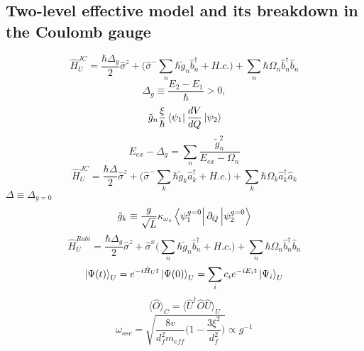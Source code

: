 \documentclass{article}
\begin{document}
\subsection*{Two-level effective model and its breakdown in the Coulomb gauge}
\begin{equation*}
    \hat{H}^{JC}_{U} = \frac{\hbar \Delta_g}{2}\hat{\sigma}^z + \bigg(\hat{\sigma}^- \sum_n \hbar\tilde{g}_n\hat{b}_n^{\dagger} + H.c.\bigg)
    + \sum_n \hbar\Omega_n \hat{b}_n^\dagger \hat{b}_n
\end{equation*}
\begin{equation*}
    \Delta_g \equiv \frac{E_2 - E_1}{\hbar} > 0,
\end{equation*}
\begin{equation*}
    \tilde{g}_n \frac{\xi}{\hbar}\bra{\psi_1}\frac{dV}{dQ}\ket{\psi_2}
\end{equation*}
\begin{equation*}
    E_{ex} - \Delta_g = \sum_n \frac{\tilde{g}^2_n}{E_{ex} - \Omega_n}
\end{equation*}
\begin{equation*}
    \hat{H}^{JC}_{U} = \frac{\hbar \Delta}{2}\hat{\sigma}^z + \bigg(\hat{\sigma}^- \sum_k \hbar\tilde{g}_k\hat{a}_k^{\dagger} + H.c.\bigg)
    + \sum_k \hbar\Omega_k \hat{a}_k^\dagger \hat{a}_k
\end{equation*}
$\Delta \equiv \Delta_{g=0}$
\begin{equation*}
    \tilde{g}_k \equiv \frac{g}{\sqrt{L}} \kappa_{\omega_c}\bra{\psi_1^{g=0}}\partial_Q\ket{\psi_2^{g=0}}
\end{equation*} 
\begin{equation*}
    \hat{H}^{Rabi}_{U} = \frac{\hbar \Delta_g}{2}\hat{\sigma}^z + \hat{\sigma}^x \bigg( \sum_n \hbar\tilde{g}_n\hat{b}_n^{\dagger} + H.c.\bigg)
    + \sum_n \hbar\Omega_n \hat{b}_n^\dagger \hat{b}_n
\end{equation*}
\begin{equation*}
    \ket{\Psi(t)}_U = e^{-i\hat{H}_U t}\ket{\Psi(0)}_U = \sum_i c_i e^{-iE_it} \ket{\Psi_i}_U
\end{equation*}
\begin{equation*}
    \langle \hat{O} \rangle_C = \langle \hat{U}^\dagger \hat{O} \hat{U} \rangle _U
\end{equation*}
\begin{equation*}
    \omega_{osc} = \sqrt{\frac{8v}{d^2_f m_{eff}}\bigg(1-\frac{3\xi^2}{d^2_f}\bigg)} \propto g^{-1}
\end{equation*}
    
\end{document}
